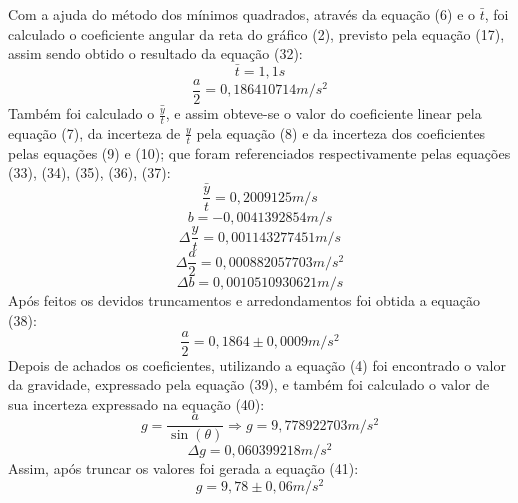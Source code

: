 \documentclass[12pt, letterpaper]{article}
\begin{document}
    


    Com a ajuda do método dos mínimos quadrados, através da equação (6) e o $\bar t$, foi calculado o coeficiente angular da reta do gráfico (2), previsto pela equação (17), assim sendo obtido o resultado da equação (32):
    \begin{equation}
        \bar t = 1,1 s
    \end{equation}
    \begin{equation}
        \frac{a}{2} = 0,186410714 m/s^2
    \end{equation}
    Também foi calculado o $\bar {\frac{y}{t}}$, e assim obteve-se o valor do coeficiente linear pela equação (7), da incerteza de $\frac{y}{t}$ pela equação (8) e da incerteza dos coeficientes pelas equações (9) e (10); que foram referenciados respectivamente pelas equações (33), (34), (35), (36), (37):
    \begin{equation}
        \bar {\frac{y}{t}} = 0,2009125 m/s
    \end{equation}
    \begin{equation}
        b = -0,0041392854 m/s
    \end{equation}
    \begin{equation}
        \Delta \frac{y}{t} = 0,001143277451 m/s 
    \end{equation}
    \begin{equation}
        \Delta \frac{a}{2} = 0,000882057703 m/s^2 
    \end{equation}
    \begin{equation}
        \Delta b = 0,0010510930621 m/s 
    \end{equation}
    Após feitos os devidos truncamentos e arredondamentos foi obtida a equação (38): 
    \begin{equation}
        \frac{a}{2} = 0,1864 \pm 0,0009 m/s^2
    \end{equation}
    Depois de achados os coeficientes, utilizando a equação (4) foi encontrado o valor da gravidade, expressado pela equação (39), e também foi calculado o valor de sua incerteza expressado na equação (40):
    \begin{equation}
        g = \frac{a }{\sin(\theta)} \Rightarrow g = 9,778922703 m/s^2
    \end{equation}
    \begin{equation}
        \Delta g = 0,060399218 m/s^2
    \end{equation}
    Assim, após truncar os valores foi gerada a equação (41):
    \begin{equation}
        g = 9,78 \pm 0,06 m/s^2
    \end{equation}
\end{document}
